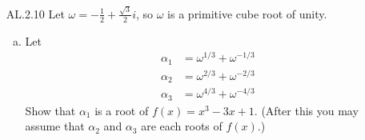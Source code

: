 \documentclass[12pt]{article}
\begin{document}
\begin{enumerate}
\begin{proof}
\begin{equation*}
                \end{equation*}
                By the same reasoning above, for all $x\neq 0$, $f$ is
                differentaible as the product, difference, and composition of
                differentiable functions. Using the product and chain rules we
                obtain 
                \begin{equation*}
                    f''(x)=
                    \big(20x^3-\frac{9}{x^3}\big)\sin\big(\frac{1}{x^3}\big)
                    -(15x+3)\cos\big(\frac{1}{x^3}\big)
                \end{equation*}
                for all $x\neq 0$. Using the same method before, we use the
                limit definition of the derivative to see if $f'(x)$ is
                differentiable at $x=0$. 
                \begin{align*}
                    f''(0)&=\lim_{x\to 0}\frac{f'(x+0)-f'(0)}{x} \\
                    &=\lim_{x\to
                    0}\frac{5x^4\sin\big(\frac{1}{x^3}\big)-3x\cos\big(\frac{1}{x^3}\big)}{x}
                      \\
                    &=\lim_{x\to0}5x^3\sin\big(\frac{1}{x^3}\big)-3\cos\big(\frac{1}{x^3}\big)
                    \\
                    &=\lim_{x\to 0}-3\cos\big(\frac{1}{x^3}\big).
                \end{align*}
                Seeing as the limit of $\cos(1/x^3)$ as $x\to 0$ does not
                exist, then we can conclude that $f''(x)$ is not differentiable
                at $x=0$. Hence, $f$ is twice differentiable. 
            \end{proof}
        \item[AL.2.10] Let $\omega=-\frac{1}{2}+\frac{\sqrt{3}}{2}i$, so
            $\omega$ is a primitive cube root of unity. 
            \begin{enumerate}[(a)]
                \item Let 
                    \begin{align*}
                        \alpha_1 &= \omega^{1/3}+\omega^{-1/3} \\
                        \alpha_2 &= \omega^{2/3}+\omega^{-2/3} \\
                        \alpha_3 &= \omega^{4/3}+\omega^{-4/3}
                    \end{align*}
                    Show that $\alpha_1$ is a root of $f(x)=x^3-3x+1$. (After this 
                    you may assume that $\alpha_2$ and $\alpha_3$ are each roots of $f(x)$.)

\end{enumerate}
\end{enumerate}
\end{document}
